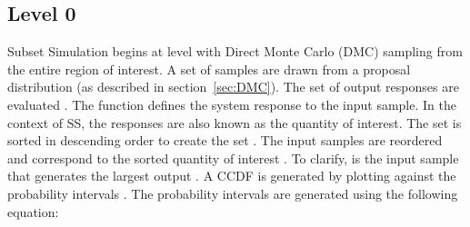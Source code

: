 \documentclass[journal]{IEEEtran}
\begin{document}
\subsection{Level 0}

Subset Simulation begins at level  with Direct Monte Carlo (DMC) sampling from the entire region of interest. A set of  samples  are drawn from a proposal distribution  (as described in section~\ref{sec:DMC}). The set of output responses  are evaluated . The function  defines the system response to the input sample. In the context of SS, the responses  are also known as the quantity of interest. The set  is sorted in descending order to create the set . The input samples  are reordered  and correspond to the sorted quantity of interest . To clarify,  is the input sample that generates the largest output . A CCDF is generated by plotting  against the probability intervals . The probability intervals  are generated using the following equation:
\end{document}
